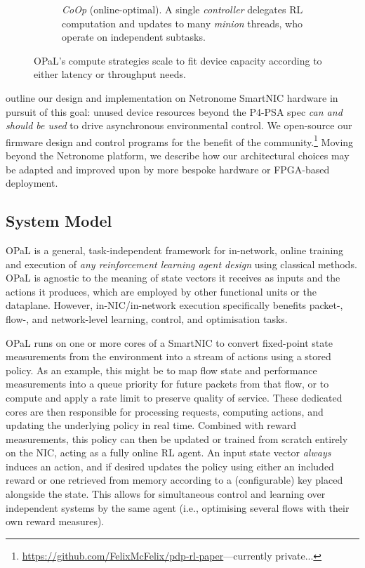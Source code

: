 \documentclass[sigconf,natbib=false]{acmart}
\newcommand{\approachshort}{OPaL}
\newcommand{\Coopfw}{\emph{CoOp}}
\begin{document}
\begin{figure}
\begin{subfigure}{0.45\linewidth}
		\caption{\Coopfw{} (online-optimal). A single \emph{controller} delegates RL computation and updates to many \emph{minion} threads, who operate on independent subtasks.\label{fig:single-and-parallel:parallel}}
	\end{subfigure}
	\caption{\approachshort{}'s compute strategies scale to fit device capacity according to either latency or throughput needs.\label{fig:single-and-parallel}}
\end{figure}

 outline our design and implementation on Netronome SmartNIC hardware in pursuit of this goal: unused device resources beyond the P4-PSA spec \emph{can and should be used} to drive asynchronous environmental control.
We open-source our firmware design and control programs for the benefit of the community.\footnote{\url{https://github.com/FelixMcFelix/pdp-rl-paper}---currently private...}
Moving beyond the Netronome platform, we describe how our architectural choices may be adapted and improved upon by more bespoke hardware or FPGA-based deployment.

\subsection{System Model}
\approachshort{} is a general, task-independent framework for in-network, online training and execution of \emph{any reinforcement learning agent design} using classical methods.
\approachshort{} is agnostic to the meaning of state vectors it receives as inputs and the actions it produces, which are employed by other functional units or the dataplane.
However, in-NIC/in-network execution specifically benefits packet-, flow-, and network-level learning, control, and optimisation tasks.

\approachshort{} runs on one or more cores of a SmartNIC to convert fixed-point state measurements from the environment into a stream of actions using a stored policy.
As an example, this might be to map flow state and performance measurements into a queue priority for future packets from that flow, or to compute and apply a rate limit to preserve quality of service.
These dedicated cores are then responsible for processing requests, computing actions, and updating the underlying policy in real time.
Combined with reward measurements, this policy can then be updated or trained from scratch entirely on the NIC, acting as a fully online RL agent.
An input state vector \emph{always} induces an action, and if desired updates the policy using either an included reward or one retrieved from memory according to a (configurable) key placed alongside the state.
This allows for simultaneous control and learning over independent systems by the same agent (i.e., optimising several flows with their own reward measures).
\end{document}
